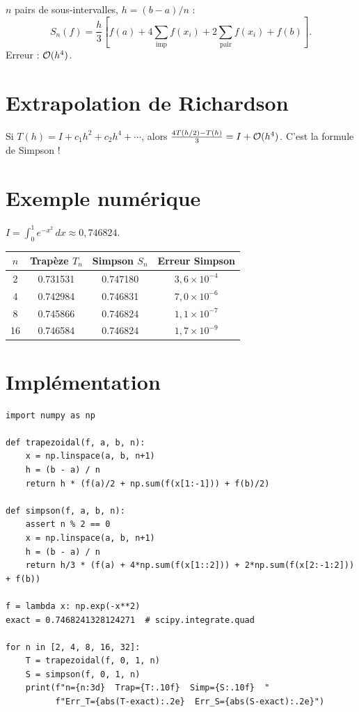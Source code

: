 \begin{definition}
$n$ pairs de sous-intervalles, $h=(b-a)/n$ :
\[
S_n(f) = \frac{h}{3}\left[f(a)+4\sum_{\text{imp}}f(x_i)+2\sum_{\text{pair}}f(x_i)+f(b)\right].
\]
Erreur : $\mathcal{O}(h^4)$.
\end{definition}

\section{Extrapolation de Richardson}

\begin{theoreme}
Si $T(h)=I+c_1h^2+c_2h^4+\cdots$, alors $\frac{4T(h/2)-T(h)}{3}=I+\mathcal{O}(h^4)$. C'est la formule de Simpson !
\end{theoreme}

\section{Exemple num\'erique}

$I=\int_0^1 e^{-x^2}\,dx\approx 0{,}746824$.

\begin{center}
\begin{tabular}{cccc}
\toprule
$n$ & Trap\`eze $T_n$ & Simpson $S_n$ & Erreur Simpson \\
\midrule
2 & 0.731531 & 0.747180 & $3{,}6\times10^{-4}$ \\
4 & 0.742984 & 0.746831 & $7{,}0\times10^{-6}$ \\
8 & 0.745866 & 0.746824 & $1{,}1\times10^{-7}$ \\
16 & 0.746584 & 0.746824 & $1{,}7\times10^{-9}$ \\
\bottomrule
\end{tabular}
\end{center}

\section{Impl\'ementation}

\begin{codeblock}[title=\textbf{Python}]
\begin{verbatim}
import numpy as np

def trapezoidal(f, a, b, n):
    x = np.linspace(a, b, n+1)
    h = (b - a) / n
    return h * (f(a)/2 + np.sum(f(x[1:-1])) + f(b)/2)

def simpson(f, a, b, n):
    assert n % 2 == 0
    x = np.linspace(a, b, n+1)
    h = (b - a) / n
    return h/3 * (f(a) + 4*np.sum(f(x[1::2])) + 2*np.sum(f(x[2:-1:2])) + f(b))

f = lambda x: np.exp(-x**2)
exact = 0.7468241328124271  # scipy.integrate.quad

for n in [2, 4, 8, 16, 32]:
    T = trapezoidal(f, 0, 1, n)
    S = simpson(f, 0, 1, n)
    print(f"n={n:3d}  Trap={T:.10f}  Simp={S:.10f}  "
          f"Err_T={abs(T-exact):.2e}  Err_S={abs(S-exact):.2e}")
\end{verbatim}
\end{codeblock}

